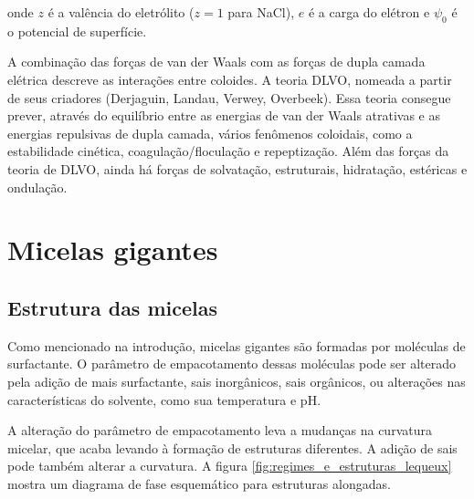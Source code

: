 	\noindent onde \(z\) é a valência do eletrólito (\(z=1\) para NaCl), \(e\) é a carga do elétron e \(\psi_0\) é o potencial de superfície.
	
	A combinação das forças de van der Waals com as forças de dupla camada elétrica descreve as interações entre coloides. A teoria DLVO, nomeada a partir de seus criadores (Derjaguin, Landau, Verwey, Overbeek). Essa teoria consegue prever, através do equilíbrio entre as energias de van der Waals atrativas e as energias repulsivas de dupla camada, vários fenômenos coloidais, como a estabilidade cinética, coagulação/floculação e repeptização. Além das forças da teoria de DLVO, ainda há forças de solvatação, estruturais, hidratação, estéricas e ondulação. 
	

	\chapter{Micelas gigantes} 
		\label{chap:micelas_gigantes}
		\section{Estrutura das micelas}  %
		Como mencionado na introdução, micelas gigantes são formadas por moléculas de surfactante. O parâmetro de empacotamento dessas moléculas pode ser alterado pela adição de mais surfactante, sais inorgânicos, sais orgânicos, ou alterações nas características do solvente, como sua temperatura e pH. %
		
		A alteração do parâmetro de empacotamento leva a mudanças na curvatura micelar, que acaba levando à formação de estruturas diferentes. A adição de sais pode também alterar a curvatura. A figura \ref{fig:regimes_e_estruturas_lequeux} mostra um diagrama de fase esquemático para estruturas alongadas.
		
